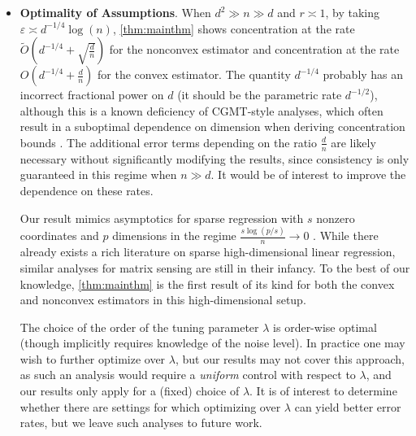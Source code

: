 \documentclass[10pt]{article}
\newcommand{\eps}{\ensuremath{\varepsilon}}
\renewcommand{\tilde}{\widetilde}
\theoremstyle{definition}
\begin{document}
\begin{itemize}
  
\item  \textbf{Optimality of Assumptions}.  
When $d^2 \gg n \gg d$ and $r \asymp 1$, by taking $\eps \asymp d^{-1/4} \log(n)$, \cref{thm:mainthm} shows concentration at the rate $\tilde O( d^{-1/4}  + \sqrt{\frac{d}{n}})$ for the nonconvex estimator and concentration at the rate $O(d^{-1/4} + \frac{d}{n})$ for the convex estimator.  The quantity $d^{-1/4}$ probably has an incorrect fractional power on $d$ (it should be the parametric rate $d^{-1/2}$), although this is a known deficiency of CGMT-style analyses, which often result in a suboptimal dependence on dimension when deriving concentration bounds \citep{chandrasekher_sharp_2023,celentano_lasso_2023,miolane_distribution_2021}. The additional error terms depending on the ratio $\frac{d}{n}$ are likely necessary without significantly modifying the results, since consistency is only guaranteed in this regime when $n \gg d$. It would be of interest to improve the dependence on these rates. 

 Our result mimics asymptotics for sparse regression with $s$ nonzero coordinates and $p$ dimensions in the regime $\frac{s \log(p/s)}{n} \to 0$ \citep{javanmard_debiasing_2018,javanmard_hypothesis_2014,bellec_debiasing_2023}. 
 While there already exists a rich literature on sparse high-dimensional linear regression, similar analyses for matrix sensing are still in their infancy.   To the best of our knowledge, \cref{thm:mainthm} is the first result of its kind for both the convex and nonconvex estimators in this high-dimensional setup.  

 
 

The choice of the order of the tuning parameter $\lambda$ is order-wise optimal (though implicitly requires knowledge of the noise level).  In practice one may wish to further optimize over $\lambda$, but our results may not cover this approach, as such an  analysis would require a \emph{uniform} control with respect to $\lambda$, and our results only apply for a (fixed) choice of $\lambda$.  It is of interest to determine whether there are settings for which optimizing over $\lambda$ can yield better error rates, but we leave such analyses to future work. 
\end{itemize}
\end{document}
